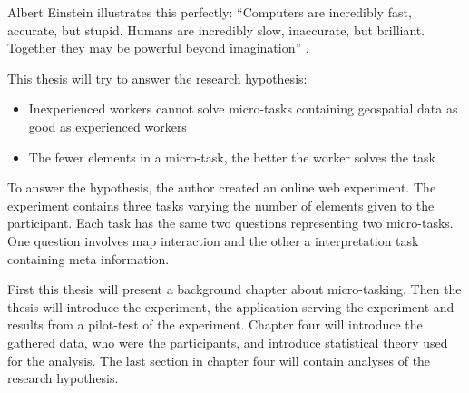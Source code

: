 

Albert Einstein illustrates this perfectly: “Computers are incredibly fast, accurate, but stupid. Humans are incredibly slow, inaccurate, but brilliant. Together they may be powerful beyond imagination” \citep{Holzinger2013}. 

This thesis will try to answer the research hypothesis: 
\begin{itemize}
	\item Inexperienced workers cannot solve micro-tasks containing geospatial data as good as experienced workers
	\item The fewer elements in a micro-task, the better the worker solves the task
\end{itemize}

To answer the hypothesis, the author created an online web experiment. The experiment contains three tasks varying the number of elements given to the participant. Each task has the same two questions representing two micro-tasks. One question involves map interaction and the other a interpretation task containing meta information. 

 First this thesis will present a background chapter about micro-tasking.  Then the thesis will introduce the experiment, the application serving the experiment and results from a pilot-test of the experiment. Chapter four will introduce the gathered data, who were the participants, and introduce statistical theory used for the analysis. The last section in chapter four will contain analyses of the research hypothesis. 